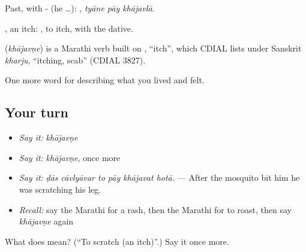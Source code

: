 Past, with - (he …):   , \emph{tyāne pāy khājavlā}.

, an itch:  , to itch, with the dative.

\begin{cousinweb}
\textbf{} (\emph{khājavṇe}) is a Marathi verb built on , \textquotedblleft{}itch\textquotedblright{}, which CDIAL lists under Sanskrit \emph{kharju}, \textquotedblleft{}itching, scab\textquotedblright{} (CDIAL 3827).
\end{cousinweb}

\begin{grammarlens}[title={What you've built}]
One more word for describing what you lived and felt.
\end{grammarlens}

\subsection*{Your turn}
\begin{itemize}
\raggedright
  \item \emph{Say it:} \emph{khājavṇe}
  \item \emph{Say it:} \emph{khājavṇe}, once more
  \item \emph{Say it:} \emph{ḍās cāvlyāvar to pāy khājavat hotā.} — After the mosquito bit him he was scratching his leg.
  \item \emph{Recall:} say the Marathi for a rash, then the Marathi for to roast, then say \emph{khājavṇe} again
\end{itemize}

\begin{tcolorbox}[breakable,colback=teal!4,colframe=teal!35!black,title={Before you move on}]
What does  mean? (\textquotedblleft{}To scratch (an itch)\textquotedblright{}.) Say it once more.
\end{tcolorbox}
